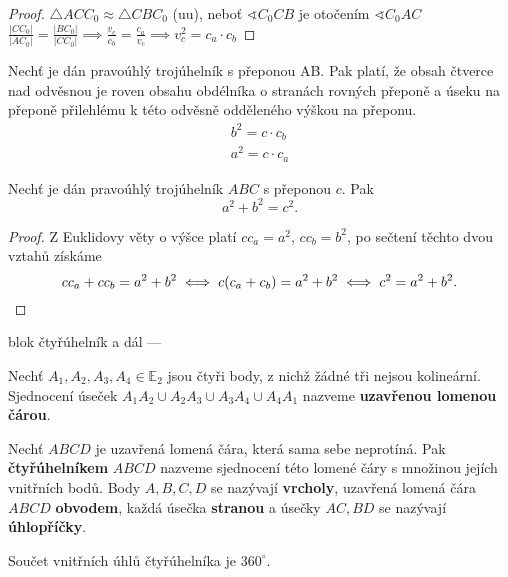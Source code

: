 \begin{proof}
  $\triangle ACC_0 \approx \triangle CBC_0$ (uu), neboť $\sphericalangle C_0 CB$ je otočením $\sphericalangle C_0 AC$
  $\frac{|CC_0|}{|AC_0|} = \frac{|BC_0|}{|CC_0|} \implies \frac{v_c}{c_b} = \frac{c_a}{v_c} \implies v_c^2 = c_a \cdot c_b$
\end{proof}

\begin{veta}
  Nechť je dán pravoúhlý trojúhelník s přeponou AB. Pak platí, že obsah čtverce nad odvěsnou je roven obsahu obdélníka o stranách rovných přeponě a úseku na přeponě přilehlému k této odvěsně odděleného výškou na přeponu.
  \begin{align*}
    b^2 = c \cdot c_b\\
    a^2 = c \cdot c_a
  \end{align*}
\end{veta}

\begin{veta}[Pythagorova]
  Nechť je dán pravoúhlý trojúhelník $ABC$ s přeponou $c$. Pak
  \[
    a^2+b^2 = c^2.
  \]
\end{veta}


\begin{proof}
  Z Euklidovy věty o výšce platí $cc_a=a^2$, $cc_b=b^2$, po sečtení těchto dvou vztahů získáme
  \[
    cc_a+cc_b=a^2+b^2 \iff c(c_a+c_b)=a^2+b^2 \iff c^2=a^2+b^2. \qedhere
  \]
\end{proof}

blok čtyřúhelník a dál ---
\begin{definition}
  Nechť $A_1,A_2, A_3, A_4 \in \mathbb E_2$ jsou čtyři body, z nichž žádné tři nejsou kolineární. Sjednocení úseček $A_1A_2\cup A_2A_3 \cup A_3A_4 \cup A_4A_1$ nazveme \textbf{uzavřenou lomenou čárou}.
\end{definition}

\begin{definition}
  Nechť $ABCD$ je uzavřená lomená čára, která sama sebe neprotíná. Pak \textbf{čtyřúhelníkem} $ABCD$ nazveme sjednocení této lomené čáry s množinou jejích vnitřních bodů. Body $A,B,C,D$ se nazývají \textbf{vrcholy}, uzavřená lomená čára $ABCD$ \textbf{obvodem}, každá úsečka \textbf{stranou} a úsečky $AC,BD$ se nazývají \textbf{úhlopříčky}.
\end{definition}

\begin{veta}
  Součet vnitřních úhlů čtyřúhelníka je $360^\circ$.
\end{veta}

